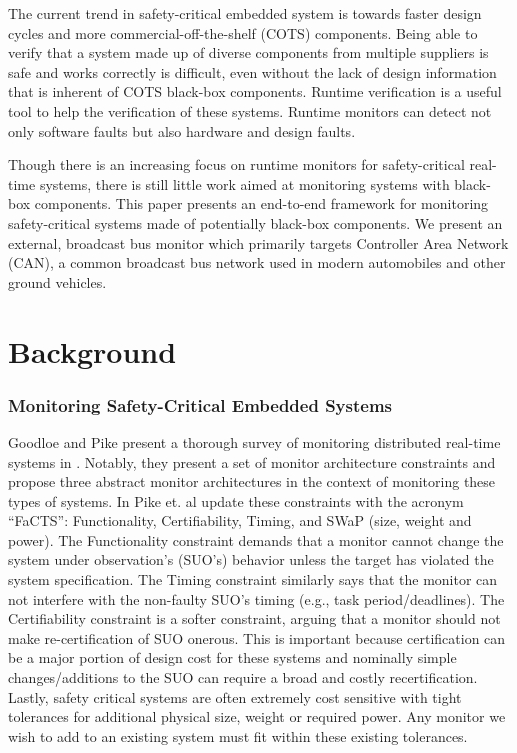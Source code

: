 \documentclass[]{../llncs/llncs}
\begin{document}
The current trend in safety-critical embedded system is towards faster design cycles and more commercial-off-the-shelf (COTS) components. Being able to verify that a system made up of diverse components from multiple suppliers is safe and works correctly is difficult, even without the lack of design information that is inherent of COTS black-box components.
%
Runtime verification is a useful tool to help the verification of these systems. Runtime monitors can detect not only software faults but also hardware and design faults. 

Though there is an increasing focus on runtime monitors for safety-critical real-time systems, there is still little work aimed at monitoring systems with black-box components. This paper presents an end-to-end framework for monitoring safety-critical systems made of potentially black-box components. 
We present an external, broadcast bus monitor which primarily targets Controller Area Network (CAN), a common broadcast bus network used in modern automobiles and other ground vehicles. 

%
% 
%
%

\section{Background}

\subsubsection{Monitoring Safety-Critical Embedded Systems}
\label{sec:bg:sc_monitor}
Goodloe and Pike present a thorough survey of monitoring distributed real-time systems in \cite{Goodloe2010}. Notably, they present a set of monitor architecture constraints and propose three abstract monitor architectures in the context of monitoring these types of systems.
%
In \cite{Pike2011} Pike et. al update these constraints with the acronym ``FaCTS'': Functionality, Certifiability, Timing, and SWaP (size, weight and power). 
The Functionality constraint demands that a monitor cannot change the system under observation's (SUO's) behavior unless the target has violated the system specification. 
The Timing constraint similarly says that the monitor can not interfere with the non-faulty SUO's timing (e.g., task period/deadlines).
The Certifiability constraint is a softer constraint, arguing that a monitor should not make re-certification of SUO onerous. This is important because certification can be a major portion of design cost for these systems and nominally simple changes/additions to the SUO can require a broad and costly recertification.
Lastly, safety critical systems are often extremely cost sensitive with tight tolerances for additional physical size, weight or required power. Any monitor we wish to add to an existing system must fit within these existing tolerances.
\end{document}
